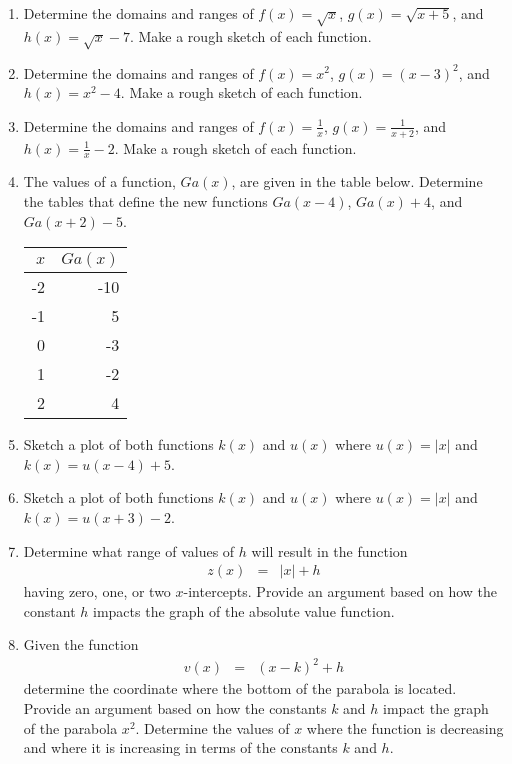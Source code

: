 \begin{enumerate}
\item Determine the domains and ranges of $f(x)=\sqrt{x}$,
  $g(x)=\sqrt{x+5}$, and $h(x)=\sqrt{x}-7$. Make a rough sketch of
  each function.
\item Determine the domains and ranges of $f(x)=x^2$, $g(x)=(x-3)^2$,
  and $h(x)=x^2-4$. Make a rough sketch of each function.
\item Determine the domains and ranges of
  $\displaystyle f(x)=\frac{1}{x}$,
  $\displaystyle g(x)=\frac{1}{x+2}$, and
  $\displaystyle h(x)=\frac{1}{x}-2$. Make a rough sketch of each
  function.
\item The values of a function, $Ga(x)$, are given in the table
  below. Determine the tables that define the new functions $Ga(x-4)$,
  $Ga(x)+4$, and $Ga(x+2)-5$.

  \begin{tabular}{r|r}
    $x$ & $Ga(x)$ \\ \hline
    -2 & -10 \\
    -1 &  5 \\
     0 &  -3 \\
     1 &  -2 \\
     2 &  4
  \end{tabular}
  
\item Sketch a plot of both functions $k(x)$ and $u(x)$ where
  $u(x)=|x|$ and $k(x)=u(x-4)+5$.
\item Sketch a plot of both functions $k(x)$ and $u(x)$ where
  $u(x)=|x|$ and $k(x)=u(x+3)-2$.
\item Determine what range of values of $h$ will result in the
  function
  \begin{eqnarray*}
    z(x) & = & |x| + h
  \end{eqnarray*}
  having zero, one, or two $x$-intercepts. Provide an argument based
  on how the constant $h$ impacts the graph of the absolute value
  function.
\item Given the function
  \begin{eqnarray*}
    v(x) & = & (x-k)^2 + h
  \end{eqnarray*}
  determine the coordinate where the bottom of the parabola is
  located. Provide an argument based on how the constants $k$ and $h$
  impact the graph of the parabola $x^2$. Determine the values of $x$
  where the function is decreasing and where it is increasing in terms
  of the constants $k$ and $h$.
\end{enumerate}

